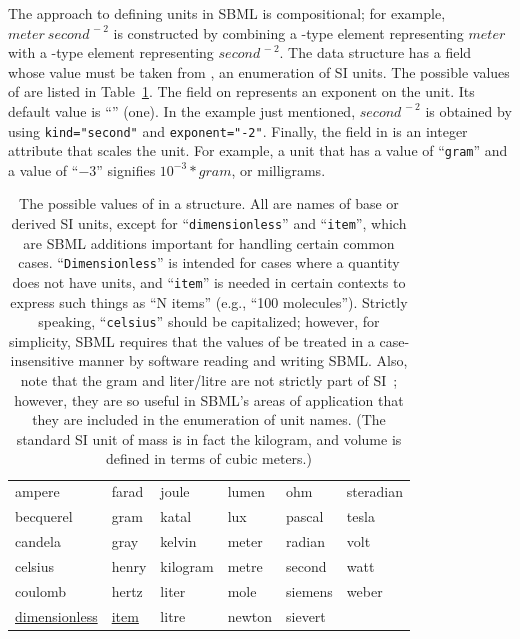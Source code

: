 \documentclass[10pt]{cekarticle}
\newcommand{\vref}[1]{\ref{#1}}
\begin{document}
The approach to defining units in SBML is compositional; for
example, $meter\ second^{\,-2}$ is constructed by combining a
-type element representing $meter$ with a
-type element representing $second^{\,-2}$.  The
 data structure has a  field whose value
must be taken from , an enumeration of SI units.
The possible values of  are listed in
Table~\vref{tab:unitkind}.  The  field on
 represents an exponent on the unit.  Its default
value is ``'' (one).  In the example just
mentioned, $second^{\,-2}$ is obtained by using
\texttt{kind="second"} and \texttt{exponent="-2"}. Finally, the
 field in  is an integer attribute that
scales the unit.  For example, a unit that has a 
value of ``\texttt{gram}'' and a  value of
``\texttt{$-3$}'' signifies $10^{-3} * gram$, or milligrams.

\begin{table}[thb]
  \centering
  \ttfamily
  \begin{tabular}{llllll}
    \toprule
    ampere      & farad & joule     & lumen     & ohm     & steradian\\
    becquerel   & gram  & katal     & lux       & pascal  & tesla\\
    candela & gray  & kelvin    & meter     & radian  & volt\\
    celsius     & henry & kilogram  & metre     & second  & watt\\
    coulomb & hertz & liter     & mole      & siemens & weber\\
    \underline{dimensionless} & \underline{item} & litre    & newton    & sievert\\
    \bottomrule
  \end{tabular}
  \caption{The possible values of  in a 
    structure.  All are names of base or derived SI units, except for
    ``\texttt{dimensionless}'' and ``\texttt{item}'', which are
    SBML additions important for handling certain common cases.
    ``\texttt{Dimensionless}'' is intended for cases where a quantity does not
    have units, and ``\texttt{item}'' is  needed in certain contexts to express
    such things as ``N items'' (e.g., ``100 molecules'').
    Strictly speaking, ``\texttt{celsius}'' should be capitalized; however,
    for simplicity, SBML requires that the values of  be
    treated in a case-insensitive manner by software reading and writing SBML.
    Also, note that the gram and liter/litre are not
    strictly part of SI~\protect\citep{taylor:1995}; however, they are so
    useful in SBML's areas of application that they are included in the
     enumeration of unit names.  (The standard SI unit of
    mass is in fact the kilogram, and volume is
    defined in terms of cubic meters.)}
  \label{tab:unitkind}
\end{table}
\end{document}

